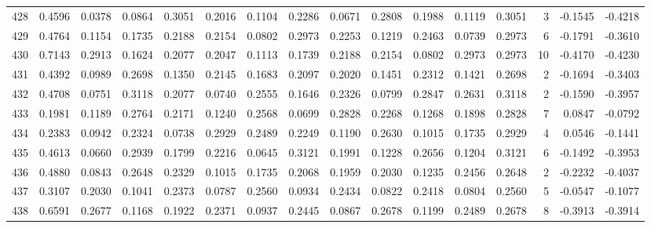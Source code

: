 \begin{tabular}{lrrrrrrrrrrrrrrr}
428 &      0.4596 &  0.0378 &  0.0864 &  0.3051 &  0.2016 &  0.1104 &  0.2286 &  0.0671 &  0.2808 &  0.1988 &   0.1119 &     0.3051 &      3 &                   -0.1545 &                    -0.4218 \\
429 &      0.4764 &  0.1154 &  0.1735 &  0.2188 &  0.2154 &  0.0802 &  0.2973 &  0.2253 &  0.1219 &  0.2463 &   0.0739 &     0.2973 &      6 &                   -0.1791 &                    -0.3610 \\
430 &      0.7143 &  0.2913 &  0.1624 &  0.2077 &  0.2047 &  0.1113 &  0.1739 &  0.2188 &  0.2154 &  0.0802 &   0.2973 &     0.2973 &     10 &                   -0.4170 &                    -0.4230 \\
431 &      0.4392 &  0.0989 &  0.2698 &  0.1350 &  0.2145 &  0.1683 &  0.2097 &  0.2020 &  0.1451 &  0.2312 &   0.1421 &     0.2698 &      2 &                   -0.1694 &                    -0.3403 \\
432 &      0.4708 &  0.0751 &  0.3118 &  0.2077 &  0.0740 &  0.2555 &  0.1646 &  0.2326 &  0.0799 &  0.2847 &   0.2631 &     0.3118 &      2 &                   -0.1590 &                    -0.3957 \\
433 &      0.1981 &  0.1189 &  0.2764 &  0.2171 &  0.1240 &  0.2568 &  0.0699 &  0.2828 &  0.2268 &  0.1268 &   0.1898 &     0.2828 &      7 &                    0.0847 &                    -0.0792 \\
434 &      0.2383 &  0.0942 &  0.2324 &  0.0738 &  0.2929 &  0.2489 &  0.2249 &  0.1190 &  0.2630 &  0.1015 &   0.1735 &     0.2929 &      4 &                    0.0546 &                    -0.1441 \\
435 &      0.4613 &  0.0660 &  0.2939 &  0.1799 &  0.2216 &  0.0645 &  0.3121 &  0.1991 &  0.1228 &  0.2656 &   0.1204 &     0.3121 &      6 &                   -0.1492 &                    -0.3953 \\
436 &      0.4880 &  0.0843 &  0.2648 &  0.2329 &  0.1015 &  0.1735 &  0.2068 &  0.1959 &  0.2030 &  0.1235 &   0.2456 &     0.2648 &      2 &                   -0.2232 &                    -0.4037 \\
437 &      0.3107 &  0.2030 &  0.1041 &  0.2373 &  0.0787 &  0.2560 &  0.0934 &  0.2434 &  0.0822 &  0.2418 &   0.0804 &     0.2560 &      5 &                   -0.0547 &                    -0.1077 \\
438 &      0.6591 &  0.2677 &  0.1168 &  0.1922 &  0.2371 &  0.0937 &  0.2445 &  0.0867 &  0.2678 &  0.1199 &   0.2489 &     0.2678 &      8 &                   -0.3913 &                    -0.3914 \\

\end{tabular}
